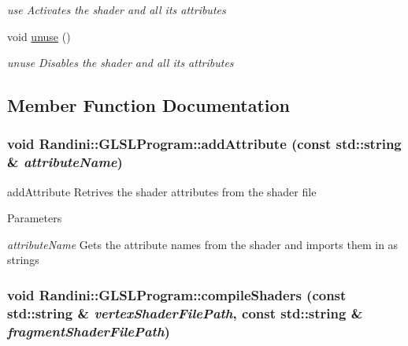 \begin{DoxyCompactItemize}
\begin{DoxyCompactList}\small\item\em use Activates the shader and all its attributes \item\end{DoxyCompactList}\item 
\hypertarget{classRandini_1_1GLSLProgram_a29fb698f73e40621ec181ed7c3c3e7be}{
void \hyperlink{classRandini_1_1GLSLProgram_a29fb698f73e40621ec181ed7c3c3e7be}{unuse} ()}
\label{classRandini_1_1GLSLProgram_a29fb698f73e40621ec181ed7c3c3e7be}

\begin{DoxyCompactList}\small\item\em unuse Disables the shader and all its attributes \item\end{DoxyCompactList}\end{DoxyCompactItemize}


\subsection{Member Function Documentation}
\hypertarget{classRandini_1_1GLSLProgram_ad623f8c42dfa974c7820949905a53d18}{
\subsubsection[{addAttribute}]{\setlength{\rightskip}{0pt plus 5cm}void Randini::GLSLProgram::addAttribute (const std::string \& {\em attributeName})}}
\label{classRandini_1_1GLSLProgram_ad623f8c42dfa974c7820949905a53d18}


addAttribute Retrives the shader attributes from the shader file 
\begin{DoxyParams}{Parameters}
\item[{\em attributeName}]Gets the attribute names from the shader and imports them in as strings \end{DoxyParams}
\hypertarget{classRandini_1_1GLSLProgram_a73328c415caa63862b713bb840b85532}{
\subsubsection[{compileShaders}]{\setlength{\rightskip}{0pt plus 5cm}void Randini::GLSLProgram::compileShaders (const std::string \& {\em vertexShaderFilePath}, \/  const std::string \& {\em fragmentShaderFilePath})}}
\label{classRandini_1_1GLSLProgram_a73328c415caa63862b713bb840b85532}


